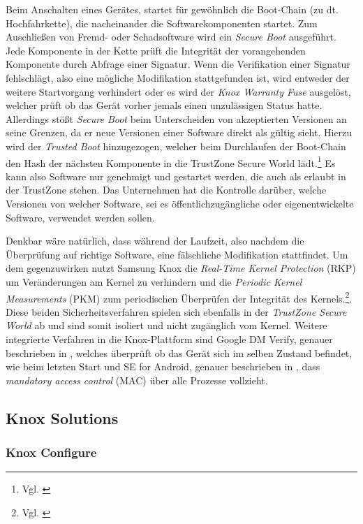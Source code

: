 Beim Anschalten eines Gerätes, startet für gewöhnlich die Boot-Chain (zu dt. Hochfahrkette), die nacheinander die Softwarekomponenten startet. Zum Auschließen von Fremd- oder Schadsoftware wird ein \textit{Secure Boot} ausgeführt. Jede Komponente in der Kette prüft die Integrität der vorangehenden Komponente durch Abfrage einer Signatur. Wenn die Verifikation einer Signatur fehlschlägt, also eine mögliche Modifikation stattgefunden ist, wird entweder der weitere Startvorgang verhindert oder es wird der \textit{Knox Warranty Fuse} ausgelöst, welcher prüft ob das Gerät vorher jemals einen unzulässigen Status hatte. Allerdings stößt \textit{Secure Boot} beim Unterscheiden von akzeptierten Versionen an seine Grenzen, da er neue Versionen einer Software direkt als gültig sieht. Hierzu wird der \textit{Trusted Boot} hinzugezogen, welcher beim Durchlaufen der Boot-Chain den Hash der nächsten Komponente in die TrustZone Secure World lädt.\footnote{Vgl. \cite{sam2017d} } Es kann also Software nur genehmigt und gestartet werden, die auch als erlaubt in der TrustZone stehen. Das Unternehmen hat die Kontrolle darüber, welche Versionen von welcher Software, sei es öffentlichzugängliche oder eigenentwickelte Software, verwendet werden sollen. 

Denkbar wäre natürlich, dass während der Laufzeit, also nachdem die Überprüfung auf richtige Software, eine fälschliche Modifikation stattfindet. Um dem gegenzuwirken nutzt Samsung Knox die \textit{Real-Time Kernel Protection} (RKP) um Veränderungen am Kernel zu verhindern und die \textit{Periodic Kernel Measurements} (PKM) zum periodischen Überprüfen der Integrität des Kernels.\footnote{Vgl. \cite{sam2017d} }. Diese beiden Sicherheitsverfahren spielen sich ebenfalls in der \textit{TrustZone Secure World} ab und sind somit isoliert und nicht zugänglich vom Kernel.
Weitere integrierte Verfahren in die Knox-Plattform sind Google DM Verify, genauer beschrieben in \cite{Goo2017a}, welches überprüft ob das Gerät sich im selben Zustand befindet, wie beim letzten Start und SE for Android, genauer beschrieben in \cite{Goo2017b}, dass \textit{mandatory access control} (MAC) über alle Prozesse vollzieht.
\subsection{Knox Solutions}
\subsubsection{Knox Configure}

